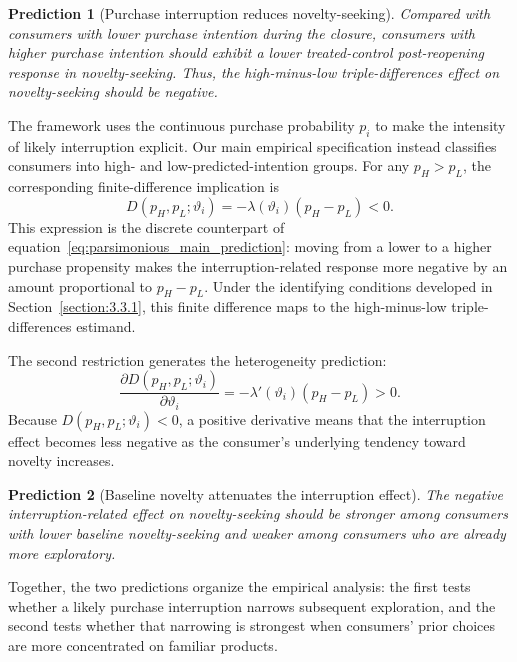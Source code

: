 \documentclass[11 pt]{article}
\newtheorem{prediction}{Prediction}
\begin{document}
\begin{prediction}[Purchase interruption reduces novelty-seeking]
Compared with consumers with lower purchase intention during the closure, consumers with higher purchase intention should exhibit a lower treated-control post-reopening response in novelty-seeking. Thus, the high-minus-low triple-differences effect on novelty-seeking should be negative.
\end{prediction}

The framework uses the continuous purchase probability $p_i$ to make the intensity of likely interruption explicit. Our main empirical specification instead classifies consumers into high- and low-predicted-intention groups. For any $p_H>p_L$, the corresponding finite-difference implication is
\begin{equation}
D(p_H,p_L;\vartheta_i)
=
-\lambda(\vartheta_i)(p_H-p_L)
<0.
\label{eq:parsimonious_binary_prediction}
\end{equation}
This expression is the discrete counterpart of equation~\eqref{eq:parsimonious_main_prediction}: moving from a lower to a higher purchase propensity makes the interruption-related response more negative by an amount proportional to $p_H-p_L$. Under the identifying conditions developed in Section~\ref{section:3.3.1}, this finite difference maps to the high-minus-low triple-differences estimand.

The second restriction generates the heterogeneity prediction:
\begin{equation}
\frac{\partial D(p_H,p_L;\vartheta_i)}
{\partial\vartheta_i}
=
-\lambda'(\vartheta_i)(p_H-p_L)
>0.
\label{eq:parsimonious_heterogeneity_prediction}
\end{equation}
Because $D(p_H,p_L;\vartheta_i)<0$, a positive derivative means that the interruption effect becomes less negative as the consumer's underlying tendency toward novelty increases.

\begin{prediction}[Baseline novelty attenuates the interruption effect]
The negative interruption-related effect on novelty-seeking should be stronger among consumers with lower baseline novelty-seeking and weaker among consumers who are already more exploratory.
\end{prediction}

Together, the two predictions organize the empirical analysis: the first tests whether a likely purchase interruption narrows subsequent exploration, and the second tests whether that narrowing is strongest when consumers' prior choices are more concentrated on familiar products.
\end{document}
